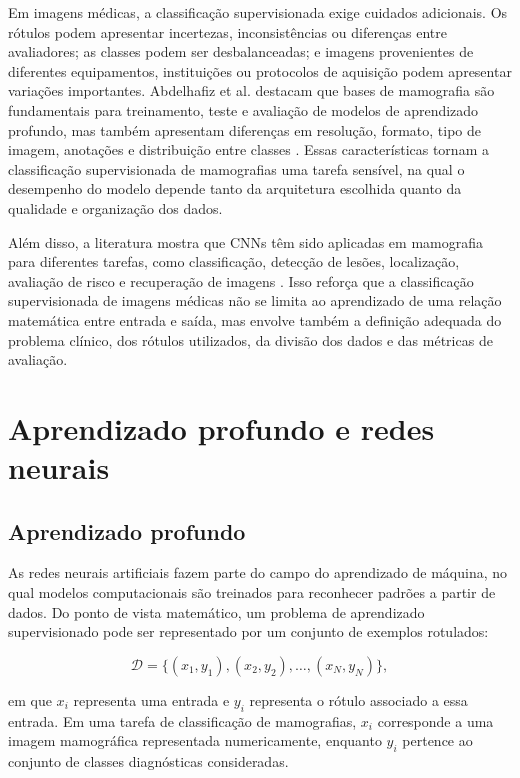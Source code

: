 \documentclass[
    12pt,
    openright,
    oneside,
    a4paper,
    english,
    brazil
]{abntex2}
\begin{document}
Em imagens médicas, a classificação supervisionada exige cuidados adicionais. Os rótulos podem apresentar incertezas, inconsistências ou diferenças entre avaliadores; as classes podem ser desbalanceadas; e imagens provenientes de diferentes equipamentos, instituições ou protocolos de aquisição podem apresentar variações importantes. Abdelhafiz et al. destacam que bases de mamografia são fundamentais para treinamento, teste e avaliação de modelos de aprendizado profundo, mas também apresentam diferenças em resolução, formato, tipo de imagem, anotações e distribuição entre classes \cite{abdelhafiz2019}. Essas características tornam a classificação supervisionada de mamografias uma tarefa sensível, na qual o desempenho do modelo depende tanto da arquitetura escolhida quanto da qualidade e organização dos dados.

Além disso, a literatura mostra que CNNs têm sido aplicadas em mamografia para diferentes tarefas, como classificação, detecção de lesões, localização, avaliação de risco e recuperação de imagens \cite{abdelhafiz2019}. Isso reforça que a classificação supervisionada de imagens médicas não se limita ao aprendizado de uma relação matemática entre entrada e saída, mas envolve também a definição adequada do problema clínico, dos rótulos utilizados, da divisão dos dados e das métricas de avaliação.

\section{Aprendizado profundo e redes neurais}

\subsection{Aprendizado profundo}

As redes neurais artificiais fazem parte do campo do aprendizado de máquina, no qual modelos computacionais são treinados para reconhecer padrões a partir de dados. Do ponto de vista matemático, um problema de aprendizado supervisionado pode ser representado por um conjunto de exemplos rotulados:

\[
\mathcal{D} = \{(x_1,y_1),(x_2,y_2),\ldots,(x_N,y_N)\},
\]

em que \(x_i\) representa uma entrada e \(y_i\) representa o rótulo associado a essa entrada. Em uma tarefa de classificação de mamografias, \(x_i\) corresponde a uma imagem mamográfica representada numericamente, enquanto \(y_i\) pertence ao conjunto de classes diagnósticas consideradas.
\end{document}
